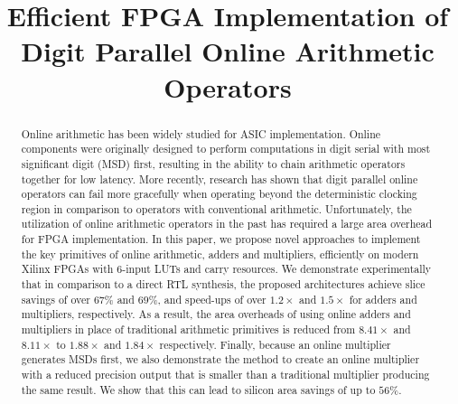 \documentclass[conference]{IEEEtran}
\begin{document}
\title{Efficient FPGA Implementation of\\ Digit Parallel Online Arithmetic Operators}



\maketitle


\begin{abstract}
Online arithmetic has been widely studied for ASIC implementation. Online components were originally designed to perform computations in digit serial with most significant digit (MSD) first, resulting in the ability to chain arithmetic operators together for low latency. More recently, research has shown that digit parallel online operators can fail more gracefully when operating beyond the deterministic clocking region in comparison to operators with conventional arithmetic. Unfortunately, the utilization of online arithmetic operators in the past has required a large area overhead for FPGA implementation. In this paper, we propose novel approaches to implement the key primitives of online arithmetic, adders and multipliers, efficiently on modern Xilinx FPGAs with 6-input LUTs and carry resources. We demonstrate experimentally that in comparison to a direct RTL synthesis, the proposed architectures achieve slice savings of over $67\%$ and $69\%$, and speed-ups of over $1.2\times$ and $1.5\times$ for adders and multipliers, respectively. As a result, the area overheads of using online adders and multipliers in place of traditional arithmetic primitives is reduced from $8.41\times$ and $8.11\times$ to $1.88\times$ and $1.84\times$ respectively. Finally, because an online multiplier generates MSDs first, we also demonstrate the method to create an online multiplier with a reduced precision output that is smaller than a traditional multiplier producing the same result. We show that this can lead to silicon area savings of up to $56\%$.




\end{abstract}
\end{document}

